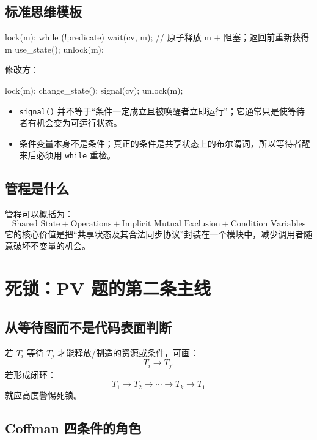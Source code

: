 \documentclass[11pt,a4paper]{ctexart}
\newcommand{\code}[1]{\texttt{#1}}
\begin{document}
\subsection{标准思维模板}

\begin{codeblock}
lock(m);
while (!predicate)
    wait(cv, m);   // 原子释放 m + 阻塞；返回前重新获得 m
use_state();
unlock(m);
\end{codeblock}

修改方：
\begin{codeblock}
lock(m);
change_state();
signal(cv);
unlock(m);
\end{codeblock}

\begin{warn}[两个必须纠正的直觉]
\begin{itemize}
\item \code{signal()} 并不等于“条件一定成立且被唤醒者立即运行”；它通常只是使等待者有机会变为可运行状态。
\item 条件变量本身不是条件；真正的条件是共享状态上的布尔谓词，所以等待者醒来后必须用 \code{while} 重检。
\end{itemize}
\end{warn}

\subsection{管程是什么}

管程可以概括为：
\[
\boxed{
\text{Shared State}
+
\text{Operations}
+
\text{Implicit Mutual Exclusion}
+
\text{Condition Variables}
}
\]
它的核心价值是把“共享状态及其合法同步协议”封装在一个模块中，减少调用者随意破坏不变量的机会。

\section{死锁：PV 题的第二条主线}

\subsection{从等待图而不是代码表面判断}

若 $T_i$ 等待 $T_j$ 才能释放/制造的资源或条件，可画：
\[
T_i\to T_j.
\]
若形成闭环：
\[
T_1\to T_2\to\cdots\to T_k\to T_1
\]
就应高度警惕死锁。

\subsection{Coffman 四条件的角色}
\end{document}

